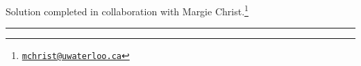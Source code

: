 \documentclass[boxes,pages,color=SeaGreen]{homework}
\newcommand{\collab}[1]{\footnote{\href{mailto:#1}{\texttt{#1}}}}
\begin{document}
\noindent Solution completed in collaboration with Margie Christ.\collab{mchrist@uwaterloo.ca}

{\noindent\color{SeaGreen!30}\rule{\textwidth}{1.5pt}}

\begin{solution}
\end{solution}
\end{document}
